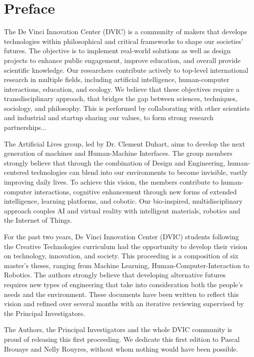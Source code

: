 \chapter*{\centering Preface}

The De Vinci Innovation Center (DVIC) is a community of makers that develops
technologies within philosophical and critical frameworks to shape our societies’
futures. The objective is to implement real-world solutions as well as design projects
to enhance public engagement, improve education, and overall provide scientific
knowledge. Our researchers contribute actively to top-level international research
in multiple fields, including artificial intelligence, human-computer interactions,
education, and ecology. We believe that these objectives require a transdisciplinary
approach, that bridges the gap between sciences, techniques, sociology, and philosophy. This is performed by collaborating with other scientists and industrial and
startup sharing our values, to form strong research partnerships...


The Artificial Lives group, led by Dr. Clement Duhart, aims to develop the next generation of machines and Human-Machine Interfaces. The group members strongly
believe that through the combination of Design and Engineering, human-centered
technologies can blend into our environments to become invisible, vastly improving
daily lives. To achieve this vision, the members contribute to human-computer
interactions, cognitive enhancement through new forms of extended intelligence,
learning platforms, and cobotic. Our bio-inspired, multidisciplinary approach couples AI and virtual reality with intelligent materials, robotics and the Internet of
Things.


For the past two years, De Vinci Innovation Center (DVIC) students following
the Creative Technologies curriculum had the opportunity to develop their vision
on technology, innovation, and society. This proceeding is a composition of six
master’s theses, ranging from Machine Learning, Human-Computer-Interaction to
Robotics. The authors strongly believe that developing alternative futures requires
new types of engineering that take into consideration both the people’s needs and
the environment. These documents have been written to reflect this vision and
refined over several months with an iterative reviewing supervised by the Principal
Investigators.


The Authors, the Principal Investigators and the whole DVIC community is proud
of releasing this first proceeding. We dedicate this first edition to Pascal Brouaye
and Nelly Rouyres, without whom nothing would have been possible.

